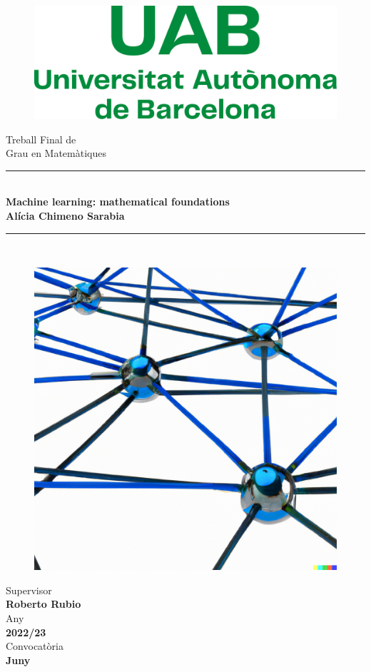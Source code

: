 \documentclass[/main.tex]{subfiles}
\begin{document}
	\begin{center}
	    \begin{figure}
	        \centering
	        \includegraphics[width=0.5\linewidth]{imgs/uab.pdf}
	    \end{figure} \mbox{} \par
		\vspace{1cm}
		{\Huge Treball Final de} \\ \bigskip
		{\LARGE Grau en Matemàtiques} \\
		\vfill
        \noindent\rule{\textwidth}{1pt} \\ \bigskip
		{\Huge \bfseries Machine learning: mathematical foundations} \\
		\vspace{1cm}
		{\LARGE \textbf{Alícia Chimeno Sarabia}} \\ \bigskip %
	    \noindent\rule{\textwidth}{1pt} \\ 
	    \vfill
	    
	    	\begin{figure}[h]
	    	\centering
	    	\includegraphics[width=0.5\linewidth]{imgs/dalle.png}
	    \end{figure} \mbox{} \par
	    Supervisor \\ \textbf{Roberto Rubio} \\ \medskip
		Any \\ \textbf{2022/23} \\ \medskip
		Convocatòria \\ \textbf{Juny}
	\end{center}
\end{document}

